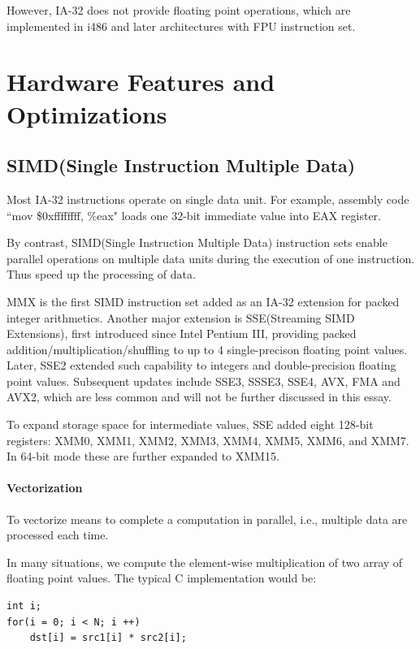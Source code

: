 \documentclass[a4paper]{report}
\begin{document}
	However, IA-32 does not provide floating point operations, which are implemented in i486 and later architectures with FPU instruction set.

\section{Hardware Features and Optimizations} \indent

\subsection{SIMD(Single Instruction Multiple Data)} \indent

	Most IA-32 instructions operate on single data unit. For example, assembly code ``mov \$0xffffffff, \%eax" loads one 32-bit immediate value into EAX register.
	
	By contrast, SIMD(Single Instruction Multiple Data) instruction sets enable parallel operations on multiple data units during the execution of one instruction. Thus speed up the processing of data.

	MMX is the first SIMD instruction set added as an IA-32 extension for packed integer arithmetics. Another major extension is SSE(Streaming SIMD Extensions), first introduced since Intel Pentium III, providing packed addition/multiplication/shuffling to up to 4 single-precison floating point values. Later, SSE2 extended such capability to integers and double-precision floating point values. Subsequent updates include SSE3, SSSE3, SSE4, AVX, FMA and AVX2, which are less common and will not be further discussed in this essay.

	To expand storage space for intermediate values, SSE added eight 128-bit registers: XMM0, XMM1, XMM2, XMM3, XMM4, XMM5, XMM6, and XMM7. In 64-bit mode these are further expanded to XMM15.

\paragraph{Vectorization} \indent \bigskip

	To vectorize means to complete a computation in parallel, i.e., multiple data are processed each time.
	
	In many situations, we compute the element-wise multiplication of two array of floating point values. The typical C implementation would be:
	
        \lstset{language = c, tabsize = 4}
        \begin{lstlisting}
int i;
for(i = 0; i < N; i ++)
	dst[i] = src1[i] * src2[i];
        \end{lstlisting}
\end{document}
